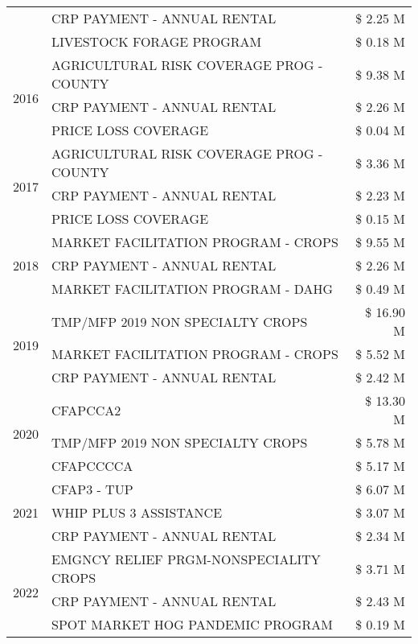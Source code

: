 \begin{tabular}{llr}
 & CRP PAYMENT - ANNUAL RENTAL & \$ 2.25 M \\
 & LIVESTOCK FORAGE PROGRAM & \$ 0.18 M \\
\cline{1-3}
\multirow[t]{3}{*}{2016} & AGRICULTURAL RISK COVERAGE PROG - COUNTY & \$ 9.38 M \\
 & CRP PAYMENT - ANNUAL RENTAL & \$ 2.26 M \\
 & PRICE LOSS COVERAGE & \$ 0.04 M \\
\cline{1-3}
\multirow[t]{3}{*}{2017} & AGRICULTURAL RISK COVERAGE PROG - COUNTY & \$ 3.36 M \\
 & CRP PAYMENT - ANNUAL RENTAL & \$ 2.23 M \\
 & PRICE LOSS COVERAGE & \$ 0.15 M \\
\cline{1-3}
\multirow[t]{3}{*}{2018} & MARKET FACILITATION PROGRAM - CROPS & \$ 9.55 M \\
 & CRP PAYMENT - ANNUAL RENTAL & \$ 2.26 M \\
 & MARKET FACILITATION PROGRAM - DAHG & \$ 0.49 M \\
\cline{1-3}
\multirow[t]{3}{*}{2019} & TMP/MFP 2019 NON SPECIALTY CROPS & \$ 16.90 M \\
 & MARKET FACILITATION PROGRAM - CROPS & \$ 5.52 M \\
 & CRP PAYMENT - ANNUAL RENTAL & \$ 2.42 M \\
\cline{1-3}
\multirow[t]{3}{*}{2020} & CFAPCCA2 & \$ 13.30 M \\
 & TMP/MFP 2019 NON SPECIALTY CROPS & \$ 5.78 M \\
 & CFAPCCCCA & \$ 5.17 M \\
\cline{1-3}
\multirow[t]{3}{*}{2021} & CFAP3 - TUP & \$ 6.07 M \\
 & WHIP PLUS 3 ASSISTANCE & \$ 3.07 M \\
 & CRP PAYMENT - ANNUAL RENTAL & \$ 2.34 M \\
\cline{1-3}
\multirow[t]{3}{*}{2022} & EMGNCY RELIEF PRGM-NONSPECIALITY CROPS & \$ 3.71 M \\
 & CRP PAYMENT - ANNUAL RENTAL & \$ 2.43 M \\
 & SPOT MARKET HOG PANDEMIC PROGRAM & \$ 0.19 M \\
\cline{1-3}
\bottomrule
\end{tabular}
